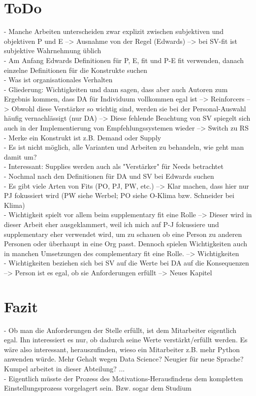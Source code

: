 \section{ToDo}
\label{ch:todo}
- Manche Arbeiten unterscheiden zwar explizit zwischen subjektiven und objektiven P und E --> Ausnahme von der Regel (Edwards) --> bei SV-fit ist subjektive Wahrnehmung üblich \\
- Am Anfang Edwards Definitionen für P, E, fit und P-E fit verwenden, danach einzelne Definitionen für die Konstrukte suchen \\
- Was ist organisationales Verhalten \\
- Gliederung: Wichtigkeiten und dann sagen, dass aber auch Autoren zum Ergebnis kommen, dass DA für Individuum vollkommen egal ist --> Reinforcers --> Obwohl diese Verstärker so wichtig sind, werden sie bei der Personal-Auswahl häufig vernachlässigt (nur DA) --> Diese fehlende Beachtung von SV spiegelt sich auch in der Implementierung von Empfehlungssystemen wieder --> Switch zu RS \\
- Merke ein Konstrukt ist z.B. Demand oder Supply \\
- Es ist nicht möglich, alle Varianten und Arbeiten zu behandeln, wie geht man damit um? \\
- Interessant: Supplies werden auch als "Verstärker" für Needs betrachtet \\
- Nochmal nach den Definitionen für DA und SV bei Edwards suchen \\
- Es gibt viele Arten von Fits (PO, PJ, PW, etc.) --> Klar machen, dass hier nur PJ fokussiert wird (PW siehe Werbel; PO siehe O-Klima bzw. Schneider bei Klima) \\
- Wichtigkeit spielt vor allem beim supplementary fit eine Rolle --> Dieser wird in dieser Arbeit eher ausgeklammert, weil ich mich auf P-J fokussiere und supplementary eher verwendet wird, um zu schauen ob eine Person zu anderen Personen oder überhaupt in eine Org passt. Dennoch spielen Wichtigkeiten auch in manchen Umsetzungen des complementary fit eine Rolle. --> Wichtigkeiten \\
- Wichtigkeiten beziehen sich bei SV auf die Werte bei DA auf die Konsequenzen --> Person ist es egal, ob sie Anforderungen erfüllt --> Neues Kapitel

\section{Fazit}
\label{ch:fazit}
- Ob man die Anforderungen der Stelle erfüllt, ist dem Mitarbeiter eigentlich egal. Ihn interessiert es nur, ob dadurch seine Werte verstärkt/erfüllt werden. Es wäre also interessant, herauszufinden, wieso ein Mitarbeiter z.B. mehr Python anwenden würde. Mehr Gehalt wegen Data Science? Neugier für neue Sprache? Kumpel arbeitet in dieser Abteilung? ... \\
- Eigentlich müsste der Prozess des Motivations-Herausfindens dem kompletten Einstellungsprozess vorgelagert sein. Bzw. sogar dem Studium
